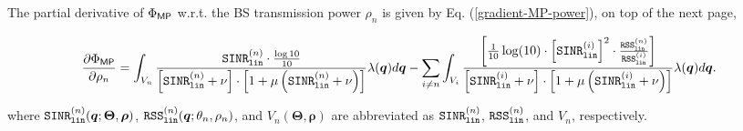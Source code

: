 \begin{Proposition}\label{gradient-formula-MP-power}
The partial derivative of $\Phi_{{\sf MP}}$ w.r.t. the BS transmission power $\rho_n$ is given by Eq. (\ref{gradient-MP-power}),  on top of the next page,
\begin{figure*}[t!]
    \begin{multline}\label{gradient-MP-power}
    \frac{\partial \Phi_{{\sf MP}}}{\partial \rho_n} =   \int_{V_n }  \frac{\mathtt{SINR}^{(n)}_{\mathtt{lin}} \cdot \frac{\log 10}{10}}{\left[\mathtt{SINR}^{(n)}_{\mathtt{lin}} + \nu \right] \cdot 
    \left[ 1 + \mu \left( \mathtt{SINR}^{(n)}_{\mathtt{lin}} + \nu \right) \right] }   \lambda(\bm{q})d\bm{q}   
    - \sum_{i\neq n}   \int_{V_i }     \frac{\left[\frac{1}{10}\log (10) \cdot \left[ \mathtt{SINR}^{(i)}_{\mathtt{lin}} \right]^2 \cdot \frac{\mathtt{RSS}^{(n)}_{\mathtt{lin}}}{\mathtt{RSS}^{(i)}_{\mathtt{lin}}}
    \right]}{\left[\mathtt{SINR}^{(i)}_{\mathtt{lin}} + \nu \right] \cdot 
    \left[ 1 + \mu \left( \mathtt{SINR}^{(i)}_{\mathtt{lin}} + \nu \right) \right] }  
     \lambda(\bm{q})d\bm{q}.
\end{multline}
\end{figure*}
where $\mathtt{SINR}^{(n)}_{\mathtt{lin}}(\bm{q}; \bm{\Theta}, \bm{\rho})$, $\mathtt{RSS}^{(n)}_{\mathtt{lin}}(\bm{q}; \theta_n, \rho_n)$, and $V_n(\bm{\Theta}, \bm{\rho})$ are abbreviated as
$\mathtt{SINR}^{(n)}_{\mathtt{lin}} $, $\mathtt{RSS}^{(n)}_{\mathtt{lin}}$, and $V_n$, respectively. 
\end{Proposition}
